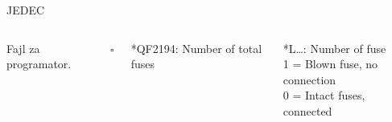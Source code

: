 \begin{frame}[label=07-s008]{JEDEC}
\begin{columns}[T,onlytextwidth]
\fontsize{10}{12}\selectfont
Fajl za programator.\par
$\square$\par

\textcolor{DEcrvena}{*QF2194: Number of total fuses}\par\vspace{1mm}

\vspace{2mm}
\textcolor{DEcrvena}{*L…: Number of fuse}\\[2mm]
\textcolor{DEcrvena}{1 = Blown fuse, no connection\\0 = Intact fuses, connected}
\end{columns}
\end{frame}
